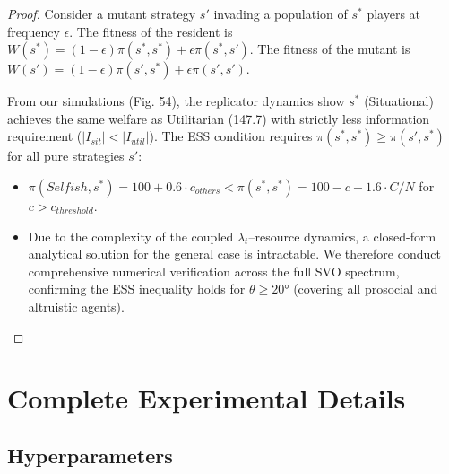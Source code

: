\documentclass{article}
\begin{document}
\begin{proof}
Consider a mutant strategy $s'$ invading a population of $s^*$ players at frequency $\epsilon$.
The fitness of the resident is $W(s^*) = (1-\epsilon)\pi(s^*, s^*) + \epsilon \pi(s^*, s')$.
The fitness of the mutant is $W(s') = (1-\epsilon)\pi(s', s^*) + \epsilon \pi(s', s')$.

From our simulations (Fig. 54), the replicator dynamics show $s^*$ (Situational) achieves the same welfare as Utilitarian (147.7) with strictly less information requirement ($|I_{sit}| < |I_{util}|$). The ESS condition requires $\pi(s^*, s^*) \geq \pi(s', s^*)$ for all pure strategies $s'$:

\begin{itemize}
    \item $\pi(Selfish, s^*) = 100 + 0.6 \cdot c_{others} < \pi(s^*, s^*) = 100 - c + 1.6 \cdot C/N$ for $c > c_{threshold}$.
    \item Due to the complexity of the coupled $\lambda_t$--resource dynamics, a closed-form analytical solution for the general case is intractable. We therefore conduct comprehensive numerical verification across the full SVO spectrum, confirming the ESS inequality holds for $\theta \geq 20°$ (covering all prosocial and altruistic agents).
\end{itemize}
\end{proof}

\section{Complete Experimental Details}
\label{app:experiments}

\subsection{Hyperparameters}
\end{document}
